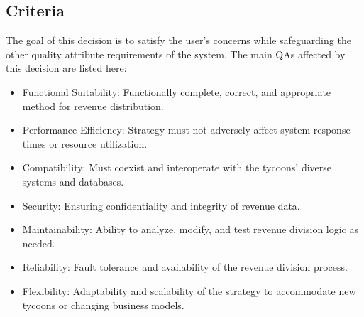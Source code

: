 \subsection*{Criteria}
The goal of this decision is to satisfy the user's concerns while safeguarding the other quality attribute requirements of the system. The main QAs affected by this decision are listed here:
\begin{itemize}
    \item Functional Suitability: Functionally complete, correct, and appropriate method for revenue distribution.
    \item Performance Efficiency: Strategy must not adversely affect system response times or resource utilization.
    \item Compatibility: Must coexist and interoperate with the tycoons' diverse systems and databases.
    \item Security: Ensuring confidentiality and integrity of revenue data.
    \item Maintainability: Ability to analyze, modify, and test revenue division logic as needed.
    \item Reliability: Fault tolerance and availability of the revenue division process.
    \item Flexibility: Adaptability and scalability of the strategy to accommodate new tycoons or changing business models.
\end{itemize}

